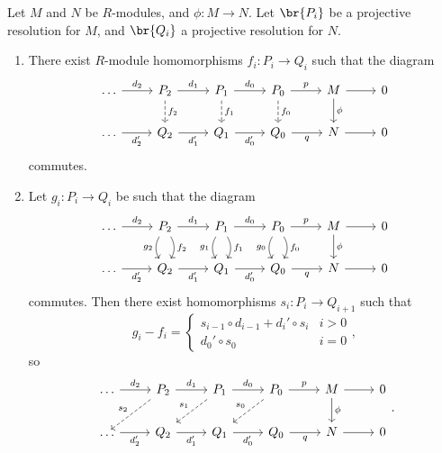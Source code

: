 \begin{proposition}
\label{prop:projectiveresolution}
Let $ M $ and $ N $ be $ R $-modules, and $ \phi : M \to N $. Let $ \br{P_i} $ be a projective resolution for $ M $, and $ \br{Q_i} $ a projective resolution for $ N $.
\begin{enumerate}
\item There exist $ R $-module homomorphisms $ f_i : P_i \to Q_i $ such that the diagram
$$
\begin{tikzcd}
\dots \arrow{r}{d_2} & P_2 \arrow{r}{d_1} \arrow[dashed]{d}{f_2} & P_1 \arrow{r}{d_0} \arrow[dashed]{d}{f_1} & P_0 \arrow{r}{p} \arrow[dashed]{d}{f_0} & M \arrow{r} \arrow{d}{\phi} & 0 \\
\dots \arrow{r}[swap]{d_2'} & Q_2 \arrow{r}[swap]{d_1'} & Q_1 \arrow{r}[swap]{d_0'} & Q_0 \arrow{r}[swap]{q} & N \arrow{r} & 0
\end{tikzcd}
$$
commutes.
\item Let $ g_i : P_i \to Q_i $ be such that the diagram
$$
\begin{tikzcd}
\dots \arrow{r}{d_2} & P_2 \arrow{r}{d_1} \arrow[bend right=30]{d}[swap]{g_2} \arrow[bend left=30]{d}{f_2} & P_1 \arrow{r}{d_0} \arrow[bend right=30]{d}[swap]{g_1} \arrow[bend left=30]{d}{f_1} & P_0 \arrow{r}{p} \arrow[bend right=30]{d}[swap]{g_0} \arrow[bend left=30]{d}{f_0} & M \arrow{r} \arrow{d}{\phi} & 0 \\
\dots \arrow{r}[swap]{d_2'} & Q_2 \arrow{r}[swap]{d_1'} & Q_1 \arrow{r}[swap]{d_0'} & Q_0 \arrow{r}[swap]{q} & N \arrow{r} & 0
\end{tikzcd}
$$
commutes. Then there exist homomorphisms $ s_i : P_i \to Q_{i + 1} $ such that
$$ g_i - f_i =
\begin{cases}
s_{i - 1} \circ d_{i - 1} + d_i' \circ s_i & i > 0 \\
d_0' \circ s_0 & i = 0
\end{cases},
$$
so
$$
\begin{tikzcd}
\dots \arrow{r}{d_2} & P_2 \arrow{r}{d_1} \arrow[dashed]{dl}[swap]{s_2} & P_1 \arrow{r}{d_0} \arrow[dashed]{dl}[swap]{s_1} & P_0 \arrow{r}{p} \arrow[dashed]{dl}[swap]{s_0} & M \arrow{r} \arrow{d}{\phi} & 0 \\
\dots \arrow{r}[swap]{d_2'} & Q_2 \arrow{r}[swap]{d_1'} & Q_1 \arrow{r}[swap]{d_0'} & Q_0 \arrow{r}[swap]{q} & N \arrow{r} & 0
\end{tikzcd}.
$$
\end{enumerate}
\end{proposition}

\pagebreak

